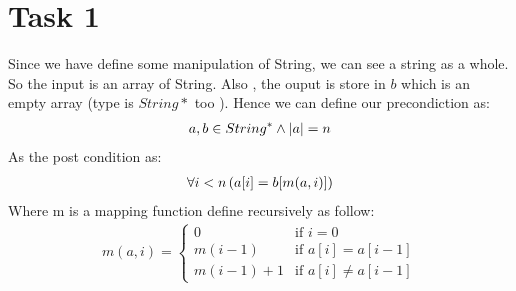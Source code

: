 \documentclass[a4paper,12pt,fleqn]{scrartcl}
\newcommand{\length}[1]{\left|#1\right|}
\begin{document}
\section{Task 1}
Since we have define some manipulation of String, we can see a 
string as a whole. So the input is an array of String. Also ,
the ouput is store in $b$ which is an empty array (type is $String*$ too 
). Hence we can define our precondiction as:
\begin{gather*}
    a,b\in String^*\And\length{a} = n
\end{gather*}
As the post condition as:
\begin{gather*}
    \forall i < n\left(a[i] = b[m(a,i)]\right)
\end{gather*}
Where m is a mapping function define recursively as follow:
\begin{gather*}
    m(a,i) = 
    \begin{cases}
        0         & \text{if } i=0\\
        m(i-1)    & \text{if } a[i] = a[i-1]\\
        m(i-1) +1 & \text{if } a[i] \neq a[i-1]
    \end{cases}
\end{gather*}
\end{document}

